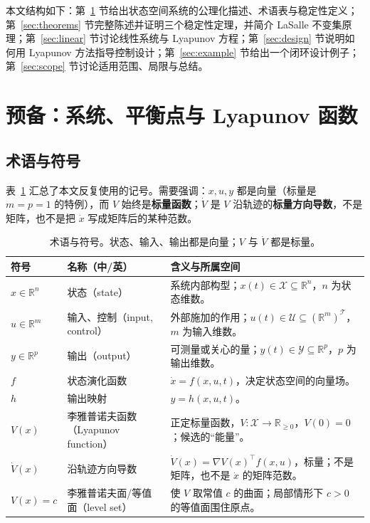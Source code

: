 \documentclass[11pt, a4paper, UTF8, fontset=none]{ctexart}
\theoremstyle{cnthm}
\newcommand{\R}{\mathbb{R}}
\newcommand{\X}{\mathcal{X}}
\newcommand{\U}{\mathcal{U}}
\newcommand{\Y}{\mathcal{Y}}
\newcommand{\T}{\mathcal{T}}
\begin{document}
本文结构如下：第~\ref{sec:prelim} 节给出状态空间系统的公理化描述、术语表与稳定性定义；第~\ref{sec:theorems} 节完整陈述并证明三个稳定性定理，并简介 LaSalle 不变集原理；第~\ref{sec:linear} 节讨论线性系统与 Lyapunov 方程；第~\ref{sec:design} 节说明如何用 Lyapunov 方法指导控制设计；第~\ref{sec:example} 节给出一个闭环设计例子；第~\ref{sec:scope} 节讨论适用范围、局限与总结。

\section{预备：系统、平衡点与 Lyapunov 函数}
\label{sec:prelim}

\subsection{术语与符号}

表~\ref{tab:notation} 汇总了本文反复使用的记号。需要强调：$x,u,y$ 都是向量（标量是 $m=p=1$ 的特例），而 $V$ 始终是\textbf{标量函数}；$\dot V$ 是 $V$ 沿轨迹的\textbf{标量方向导数}，不是矩阵，也不是把 $\dot x$ 写成矩阵后的某种范数。

\begin{table}[H]
\centering
\small
\begin{tabularx}{\textwidth}{@{}>{\raggedright\arraybackslash}p{2.55cm}>{\raggedright\arraybackslash}p{3.25cm}X@{}}
\toprule
符号 & 名称（中/英） & 含义与所属空间 \\
\midrule
$x\in\R^n$ & 状态（state） & 系统内部构型；$x(t)\in\X\subseteq\R^n$，$n$ 为状态维数。 \\
$u\in\R^m$ & 输入、控制（input, control） & 外部施加的作用；$u(t)\in\U\subseteq(\R^m)^{\T}$，$m$ 为输入维数。 \\
$y\in\R^p$ & 输出（output） & 可测量或关心的量；$y(t)\in\Y\subseteq\R^p$，$p$ 为输出维数。 \\
$f$ & 状态演化函数 & $\dot x=f(x,u,t)$，决定状态空间的向量场。 \\
$h$ & 输出映射 & $y=h(x,u,t)$。 \\
$V(x)$ & 李雅普诺夫函数（Lyapunov function） & 正定标量函数，$V:\X\to\R_{\ge0}$，$V(0)=0$；候选的“能量”。 \\
$\dot V(x)$ & 沿轨迹方向导数 & $\dot V(x)=\nabla V(x)^\top f(x,u)$，标量；不是矩阵，也不是 $\dot x$ 的矩阵范数。 \\
$V(x)=c$ & 李雅普诺夫面/等值面（level set） & 使 $V$ 取常值 $c$ 的曲面；局部情形下 $c>0$ 的等值面围住原点。 \\
\bottomrule
\end{tabularx}
\caption{术语与符号。状态、输入、输出都是向量；$V$ 与 $\dot V$ 都是标量。}
\label{tab:notation}
\end{table}
\end{document}
